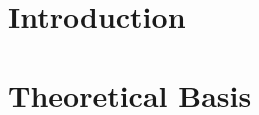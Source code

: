 \documentclass[12pt,a4paper,twoside]{report}
\theoremstyle{definition}
\begin{document}

    \parindent=0pt
    \linespread{1.2}
    \thispagestyle{plain}

%
    
	\begin{abstract}
		
	\end{abstract}
	\cleardoublepage
    
	\cleardoublepage
	
	
    \tableofcontents
    \cleardoublepage

    \setcounter{page}{1}
    \pagestyle{fancy}
 \normalsize

    
    \chapter{Introduction}

    \label{ch:Einleitung}    
    	
    \cleardoublepage
    
  	
    
    \chapter{Theoretical Basis}
    \label{ch:Grundlagen}
		
    \cleardoublepage
\end{document}

